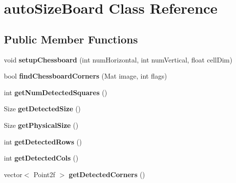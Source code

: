 \hypertarget{classautoSizeBoard}{}\section{auto\+Size\+Board Class Reference}
\label{classautoSizeBoard}
\subsection*{Public Member Functions}
\begin{DoxyCompactItemize}
\item 
void {\bfseries setup\+Chessboard} (int num\+Horizontal, int num\+Vertical, float cell\+Dim)\hypertarget{classautoSizeBoard_a78d5effbeb345ab558e3005bc647ea75}{}\label{classautoSizeBoard_a78d5effbeb345ab558e3005bc647ea75}

\item 
bool {\bfseries find\+Chessboard\+Corners} (Mat image, int flags)\hypertarget{classautoSizeBoard_a708bc58bb6378d1e68bdcd88f7fb6ce0}{}\label{classautoSizeBoard_a708bc58bb6378d1e68bdcd88f7fb6ce0}

\item 
int {\bfseries get\+Num\+Detected\+Squares} ()\hypertarget{classautoSizeBoard_a42ace17d6b62d29f479ba825c6ecfa13}{}\label{classautoSizeBoard_a42ace17d6b62d29f479ba825c6ecfa13}

\item 
Size {\bfseries get\+Detected\+Size} ()\hypertarget{classautoSizeBoard_aeb0f981b974051e6cdc4144483916163}{}\label{classautoSizeBoard_aeb0f981b974051e6cdc4144483916163}

\item 
Size {\bfseries get\+Physical\+Size} ()\hypertarget{classautoSizeBoard_ad8176f03e68c47c0cfe2113d3d8fdf12}{}\label{classautoSizeBoard_ad8176f03e68c47c0cfe2113d3d8fdf12}

\item 
int {\bfseries get\+Detected\+Rows} ()\hypertarget{classautoSizeBoard_a3b83e798ed4ebeefc17fb75268e5aa8a}{}\label{classautoSizeBoard_a3b83e798ed4ebeefc17fb75268e5aa8a}

\item 
int {\bfseries get\+Detected\+Cols} ()\hypertarget{classautoSizeBoard_a031e73274170e488ef06e6529d376f2b}{}\label{classautoSizeBoard_a031e73274170e488ef06e6529d376f2b}

\item 
vector$<$ Point2f $>$ {\bfseries get\+Detected\+Corners} ()\hypertarget{classautoSizeBoard_a092dfb83b61b64ad0c074c96335d8032}{}\label{classautoSizeBoard_a092dfb83b61b64ad0c074c96335d8032}


\end{DoxyCompactItemize}
